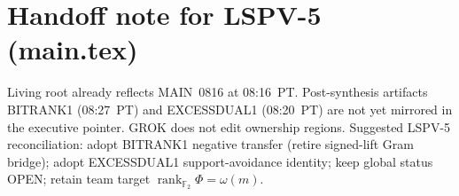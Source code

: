 \documentclass[11pt]{article}
\begin{document}
\section*{Handoff note for LSPV-5 (main.tex)}
Living root already reflects MAIN~0816 at 08:16~PT. Post-synthesis artifacts BITRANK1
(08:27~PT) and EXCESSDUAL1 (08:20~PT) are not yet mirrored in the executive pointer.
GROK does not edit ownership regions. Suggested LSPV-5 reconciliation: adopt BITRANK1
negative transfer (retire signed-lift Gram bridge); adopt EXCESSDUAL1 support-avoidance
identity; keep global status OPEN; retain team target $\operatorname{rank}_{\mathbb F_2}\Phi=\omega(m)$.
\end{document}
